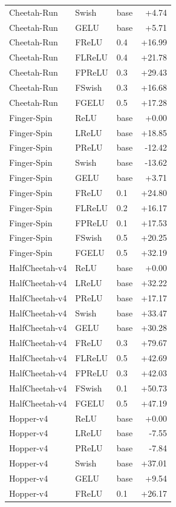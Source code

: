{\begin{longtable}{lllr}
Cheetah-Run & Swish & base & +4.74 \\
Cheetah-Run & GELU & base & +5.71 \\
Cheetah-Run & FReLU & 0.4 & +16.99 \\
Cheetah-Run & FLReLU & 0.4 & +21.78 \\
Cheetah-Run & FPReLU & 0.3 & +29.43 \\
Cheetah-Run & FSwish & 0.3 & +16.68 \\
Cheetah-Run & FGELU & 0.5 & +17.28 \\
Finger-Spin & ReLU & base & +0.00 \\
Finger-Spin & LReLU & base & +18.85 \\
Finger-Spin & PReLU & base & -12.42 \\
Finger-Spin & Swish & base & -13.62 \\
Finger-Spin & GELU & base & +3.71 \\
Finger-Spin & FReLU & 0.1 & +24.80 \\
Finger-Spin & FLReLU & 0.2 & +16.17 \\
Finger-Spin & FPReLU & 0.1 & +17.53 \\
Finger-Spin & FSwish & 0.5 & +20.25 \\
Finger-Spin & FGELU & 0.5 & +32.19 \\
HalfCheetah-v4 & ReLU & base & +0.00 \\
HalfCheetah-v4 & LReLU & base & +32.22 \\
HalfCheetah-v4 & PReLU & base & +17.17 \\
HalfCheetah-v4 & Swish & base & +33.47 \\
HalfCheetah-v4 & GELU & base & +30.28 \\
HalfCheetah-v4 & FReLU & 0.3 & +79.67 \\
HalfCheetah-v4 & FLReLU & 0.5 & +42.69 \\
HalfCheetah-v4 & FPReLU & 0.3 & +42.03 \\
HalfCheetah-v4 & FSwish & 0.1 & +50.73 \\
HalfCheetah-v4 & FGELU & 0.5 & +47.19 \\
Hopper-v4 & ReLU & base & +0.00 \\
Hopper-v4 & LReLU & base & -7.55 \\
Hopper-v4 & PReLU & base & -7.84 \\
Hopper-v4 & Swish & base & +37.01 \\
Hopper-v4 & GELU & base & +9.54 \\
Hopper-v4 & FReLU & 0.1 & +26.17 \\

\end{longtable}}
